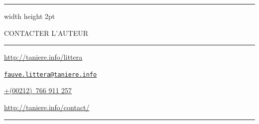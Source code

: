 \documentclass[a4paper,12pt,twoside,french]{book}
\begin{document}
  {
    \small
    \thispagestyle{empty}
    \null\vfill
    \begin{center}
      \begin{minipage}{180pt}
        \begin{center}

          \hrule width \hsize height 2pt \kern 0.5pt 

          \vspace*{8pt}

          \MakeUppercase{Contacter L’auteur}

          \vspace*{-3pt}
          \rule{\textwidth - 10pt}{0.4pt} 
        \end{center}
 
        \begin{description}[font=\normalfont,style = nextline, leftmargin = 1em]
          \item[Site web]

          \url{http://taniere.info/littera}
  
          \item[Courriel]

		  \href{mailto:fauve.littera@taniere.info?subject=[heliosskylab]}{\texttt{{fauve.littera@taniere.info}}}
  

  
          \item[Téléphone]

          \href{tel:00212766911257}{+(00212) 766 911 257}
  
          \item[Autre]

          \url{http://taniere.info/contact/}
        \end{description}

          \vspace{-1.5em}

        \begin{center}
          \noindent\rule{\textwidth - 10pt}{0.6pt}

          \vspace{1em}


\end{center}
\end{minipage}
\end{center}}
\end{document}
